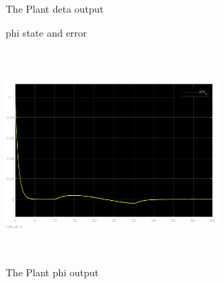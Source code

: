 \documentclass[12pt, a4paper]{article}
\begin{document}
\begin{enumerate}[1.]
\begin{figure}[H]
    \caption{The Plant deta output}
    \label{fig:label}
    \end{figure}
\begin{figure}[H]
        \centering
        \qquad
        \caption{phi state and error}
        \label{fig:example}%
    \end{figure}
\begin{figure}[H]
    \centering
    \includegraphics[width=8cm,height=8cm,scale=0.6]{phi_o.png}
    \caption{The Plant phi output}
    \label{fig:label}
    \end{figure}     

\end{enumerate}
\end{document}
